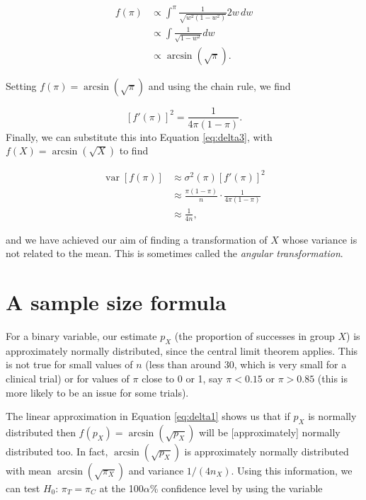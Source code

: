 \documentclass[
  openany]{book}
\theoremstyle{definition}
\theoremstyle{definition}
\theoremstyle{definition}
\theoremstyle{definition}
\theoremstyle{remark}
\begin{document}
\begin{align*}
f\left(\pi\right) & \propto \int^\pi{\frac{1}{\sqrt{w^2\left(1-w^2\right)}}2w\,dw}\\
&\propto \int{\frac{1}{\sqrt{1 - w^2}}}dw\\
& \propto \arcsin{\left(\sqrt{\pi}\right)}.
\end{align*}

Setting \(f\left(\pi\right) = \arcsin\left(\sqrt{\pi}\right)\) and using the chain rule, we find

\[\left[f'\left(\pi\right)\right]^2 = \frac{1}{4\pi\left(1-\pi\right)} .\]
Finally, we can substitute this into Equation \eqref{eq:delta3}, with \(f\left(X\right) = \arcsin\left(\sqrt{X}\right)\) to find

\begin{align*}
  \operatorname{var}\left[f\left(\pi\right)\right] & \approx \sigma^2\left(\pi\right)\left[f'\left(\pi\right)\right]^2  \\
& \approx{\frac{\pi\left(1-\pi\right)}{n}\cdot\frac{1}{4\pi\left(1-\pi\right)}}\\
& \approx{\frac{1}{4n}},
\end{align*}

and we have achieved our aim of finding a transformation of \(X\) whose variance is not related to the mean. This is sometimes called the \emph{angular transformation}.

\section{A sample size formula}\label{a-sample-size-formula}

For a binary variable, our estimate \(p_X\) (the proportion of successes in group \(X\)) is approximately normally distributed, since the central limit theorem applies. This is not true for small values of \(n\) (less than around 30, which is very small for a clinical trial) or for values of \(\pi\) close to 0 or 1, say \(\pi<0.15\) or \(\pi>0.85\) (this is more likely to be an issue for some trials).

The linear approximation in Equation \eqref{eq:delta1} shows us that if \(p_X\) is normally distributed then \(f\left(p_X\right) = \arcsin\left(\sqrt{p_X}\right)\) will be {[}approximately{]} normally distributed too. In fact, \(\arcsin\left(\sqrt{p_X}\right)\) is approximately normally distributed with mean \(\arcsin{\left(\sqrt{\pi_X}\right)}\) and variance \(1/\left(4n_X\right)\). Using this information, we can test \(H_0:\,\pi_T =\pi_C\) at the 100\(\alpha\)\% confidence level by using the variable
\end{document}
